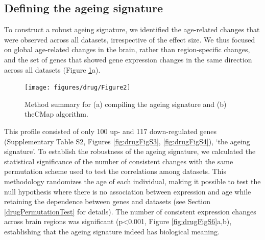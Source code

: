 \documentclass[12pt,twoside]{unicam}
\begin{document}
\hypertarget{ArrayAgeingSignatureResult}{%
\subsection{Defining the ageing signature}\label{ArrayAgeingSignatureResult}}

To construct a robust ageing signature, we identified the age-related changes that were observed across all datasets, irrespective of the effect size. We thus focused on global age-related changes in the brain, rather than region-specific changes, and the set of genes that showed gene expression changes in the same direction across all datasets (Figure \ref{fig:drugFig2}a).

\begin{figure}

{\centering \texttt{[image: figures/drug/Figure2]} 

}

\caption[Methods summary]{Method summary for (a) compiling the ageing signature and (b) theCMap algorithm.}\label{fig:drugFig2}
\end{figure}

This profile consisted of only 100 up- and 117 down-regulated genes (Supplementary Table S2, Figures \ref{fig:drugFigS3}, \ref{fig:drugFigS4}), `the ageing signature'. To establish the robustness of the ageing signature, we calculated the statistical significance of the number of consistent changes with the same permutation scheme used to test the correlations among datasets. This methodology randomizes the age of each individual, making it possible to test the null hypothesis where there is no association between expression and age while retaining the dependence between genes and datasets (see Section \ref{drugPermutationTest} for details). The number of consistent expression changes across brain regions was significant (p\textless0.001, Figure \ref{fig:drugFigS6}a,b), establishing that the ageing signature indeed has biological meaning.
\end{document}
